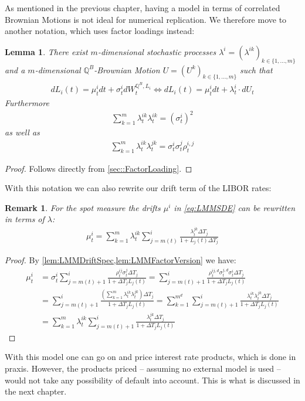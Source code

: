 \documentclass[12pt]{article}
\newtheorem{lemma}[theorem]{Lemma}
\newtheorem{remark}[theorem]{Remark}
\begin{document}
	As mentioned in the previous chapter, having a model in terms of correlated Brownian Motions is not ideal for numerical replication. We therefore move to another notation, which uses factor loadings instead:
	\begin{lemma}\label{lem:LMMFactorVersion}
		There exist $m$-dimensional stochastic processes $\lambda^{i} = (\lambda^{i k})_{k \in \{1, ..., m\}}$ and a $m$-dimensional $\mathbb{Q}^B$-Brownian Motion $U=(U^k)_{k \in \{1,...,m\}}$ such that
		\begin{align*}
			dL_i(t) = \mu^{i}_t dt + \sigma^{i}_t dW^{\mathbb{Q}^B, L_i}_t \iff 
			dL_i(t) = \mu^{i}_t dt + \lambda^{i}_t\cdot dU_t
		\end{align*}
		Furthermore
		\begin{align*}
			\sum_{k=1}^{m}\lambda^{i k}_t \lambda^{i k}_t = (\sigma^i_t)^2
		\end{align*}
		as well as
		\begin{align*}
			\sum_{k=1}^{m}\lambda^{i k}_t \lambda^{j k}_t = \sigma^i_t \sigma^j_t \rho^{i,j}_t
		\end{align*}
	\end{lemma}
	\begin{proof}
		Follows directly from \cref{sec::FactorLoading}.
	\end{proof}
	With this notation we can also rewrite our drift term of the LIBOR rates:
	\begin{remark}\label{rem:LMMDriftFactorLoadings}
		For the spot measure the drifts $\mu^{i}$ in \cref{eq:LMMSDE} can be rewritten in terms of $\lambda$:
		\begin{align*}
			\mu^{i}_t = \sum_{k=1}^{m}\lambda^{i k}_t \sum_{j=m(t)}^{i}\frac{\lambda^{j k}_t\Delta T_j}{1 + L_j(t)\Delta T_j}
		\end{align*}
	\end{remark}
	\begin{proof}
		By \cref{lem:LMMDriftSpec,lem:LMMFactorVersion} we have:
		\begin{align*}
			\mu^{i}_t &= \sigma^{i}_t\sum_{j=m(t)+1}^{i}\frac{\rho^{i j}_t \sigma^{j}_t\Delta T_j}{1 + \Delta T_j L_j(t)} = \sum_{j=m(t)+1}^{i}\frac{\rho^{i j, d}_t \sigma^{j, d}_t \sigma^{i}_t\Delta T_j}{1 + \Delta T_j L_j(t)}\\
			&= \sum_{j=m(t)+1}^{i}\frac{\left(\sum_{k=1}^{m}\lambda^{i k}_t\lambda^{j k}_t\right)\Delta T_j}{1 + \Delta T_j L_j(t)}
			=\sum_{k=1}^{m^d}\sum_{j=m(t)+1}^{i}\frac{\lambda^{i k}_t\lambda^{j k}_t\Delta T_j}{1 + \Delta T_j L_j(t)}\\
			&= \sum_{k=1}^{m}\lambda^{i k}_t\sum_{j=m(t)+1}^{i}\frac{\lambda^{j k}_t\Delta T_j}{1 + \Delta T_j L_j(t)}
		\end{align*}
	\end{proof}
	With this model one can go on and price interest rate products, which is done in praxis. However, the products priced -- assuming no external model is used -- would not take any possibility of default into account. This is what is discussed in the next chapter.
	
\end{document}
